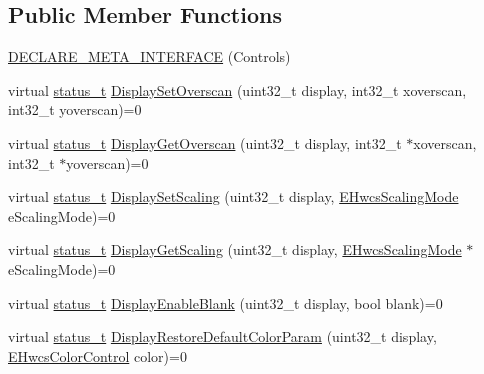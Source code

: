 \subsection*{Public Member Functions}
\begin{DoxyCompactItemize}
\item 
\mbox{\hyperlink{classhwcomposer_1_1IControls_a1049f9600bef7b150a7fb457a79e4756}{D\+E\+C\+L\+A\+R\+E\+\_\+\+M\+E\+T\+A\+\_\+\+I\+N\+T\+E\+R\+F\+A\+CE}} (Controls)
\item 
virtual \mbox{\hyperlink{hwcserviceapi_8h_a3806fb2027d9a316d8ca8d9b8b8eb96f}{status\+\_\+t}} \mbox{\hyperlink{classhwcomposer_1_1IControls_a3f14720a7ba5e37f42a8d19f37187331}{Display\+Set\+Overscan}} (uint32\+\_\+t display, int32\+\_\+t xoverscan, int32\+\_\+t yoverscan)=0
\item 
virtual \mbox{\hyperlink{hwcserviceapi_8h_a3806fb2027d9a316d8ca8d9b8b8eb96f}{status\+\_\+t}} \mbox{\hyperlink{classhwcomposer_1_1IControls_a2234b4ef06ed8dee33283b4630fdf4a1}{Display\+Get\+Overscan}} (uint32\+\_\+t display, int32\+\_\+t $\ast$xoverscan, int32\+\_\+t $\ast$yoverscan)=0
\item 
virtual \mbox{\hyperlink{hwcserviceapi_8h_a3806fb2027d9a316d8ca8d9b8b8eb96f}{status\+\_\+t}} \mbox{\hyperlink{classhwcomposer_1_1IControls_a3c4fb4608f3de4adaafce6c3d058aa74}{Display\+Set\+Scaling}} (uint32\+\_\+t display, \mbox{\hyperlink{hwcserviceapi_8h_acdadfd5e7f15097833789174e442083f}{E\+Hwcs\+Scaling\+Mode}} e\+Scaling\+Mode)=0
\item 
virtual \mbox{\hyperlink{hwcserviceapi_8h_a3806fb2027d9a316d8ca8d9b8b8eb96f}{status\+\_\+t}} \mbox{\hyperlink{classhwcomposer_1_1IControls_a341b79ec50b6145db4f46d1cd878b47c}{Display\+Get\+Scaling}} (uint32\+\_\+t display, \mbox{\hyperlink{hwcserviceapi_8h_acdadfd5e7f15097833789174e442083f}{E\+Hwcs\+Scaling\+Mode}} $\ast$e\+Scaling\+Mode)=0
\item 
virtual \mbox{\hyperlink{hwcserviceapi_8h_a3806fb2027d9a316d8ca8d9b8b8eb96f}{status\+\_\+t}} \mbox{\hyperlink{classhwcomposer_1_1IControls_af509cfd6ea30e5524ac8f2d5dd7482c1}{Display\+Enable\+Blank}} (uint32\+\_\+t display, bool blank)=0
\item 
virtual \mbox{\hyperlink{hwcserviceapi_8h_a3806fb2027d9a316d8ca8d9b8b8eb96f}{status\+\_\+t}} \mbox{\hyperlink{classhwcomposer_1_1IControls_ac3eec02e6b87c04fc9856e0b5b28b9b9}{Display\+Restore\+Default\+Color\+Param}} (uint32\+\_\+t display, \mbox{\hyperlink{hwcserviceapi_8h_a1d1cbf448ce748672cf3dd96675d70e4}{E\+Hwcs\+Color\+Control}} color)=0
\item 

\end{DoxyCompactItemize}
